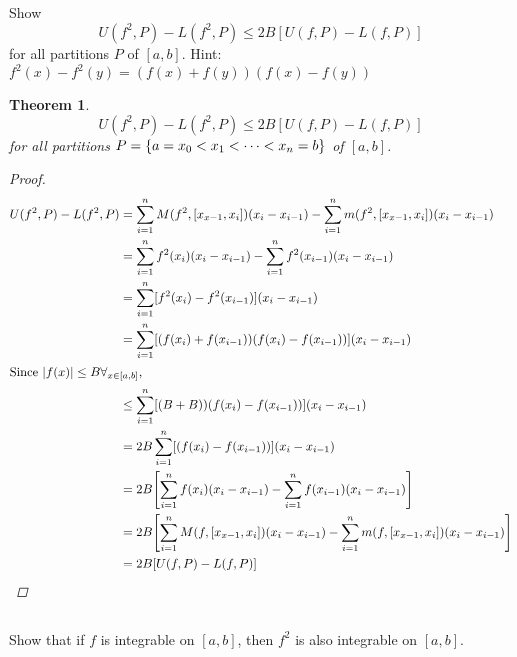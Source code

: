\documentclass[]{article}
\newtheorem{theorem}{Theorem}
\begin{document}
\subsection{}
Show\[
    U(f^2,P) - L(f^2,P) \leq 2 B[U(f,P) - L(f,P)]
\] for all partitions $P$ of $[a,b]$.
Hint: $f^2(x) - f^2(y) = (f(x) + f(y)) (f(x)-f(y))$

\begin{theorem}\label{thm:pblm2a}
    \[
        U(f^2,P) - L(f^2,P) \leq 2 B[U(f,P) - L(f,P)]
    \] for all partitions $P=\qty{a=x_0<x_1<\dots<x_n=b}$ of $[a,b]$.
    \begin{proof}
        \begin{align*}
            U(f^2,P) - L(f^2,P) 
                &= \sum_{i=1}^n M(f^2,[x_{x-1},x_{i}])(x_{i}-x_{i-1}) 
                    - \sum_{i=1}^n m(f^2,[x_{x-1},x_{i}])(x_{i}-x_{i-1})\\
                &= \sum_{i=1}^n f^2(x_i) (x_{i}-x_{i-1}) 
                    - \sum_{i=1}^n f^2(x_{i-1}) (x_{i}-x_{i-1})\\
                &= \sum_{i=1}^n [f^2(x_i) - f^2(x_{i-1})] (x_{i}-x_{i-1})\\
                &= \sum_{i=1}^n [(f(x_i) + f(x_{i-1})) (f(x_{i})-f(x_{i-1}))] (x_{i}-x_{i-1})\\
    \intertext{Since $\abs{f(x)}\leq B \forall_{x\in [a,b]}$,}
                &\leq\sum_{i=1}^n [(B + B)) (f(x_{i})-f(x_{i-1}))] (x_{i}-x_{i-1})\\
                &=2B\sum_{i=1}^n [(f(x_{i})-f(x_{i-1}))] (x_{i}-x_{i-1})\\
                &=2B\qty[
                    \sum_{i=1}^n f(x_i) (x_{i}-x_{i-1}) 
                        - \sum_{i=1}^n f(x_{i-1}) (x_{i}-x_{i-1})
                ]\\
                &= 2B\qty[
                    \sum_{i=1}^n M(f,[x_{x-1},x_{i}])(x_{i}-x_{i-1}) 
                        - \sum_{i=1}^n m(f,[x_{x-1},x_{i}])(x_{i}-x_{i-1})
                ]\\
                &= 2 B[U(f,P) - L(f,P)]
        \end{align*}
    \end{proof}
\end{theorem}

\newpage
\subsection{}
Show that if $f$ is integrable on $[a,b]$, then $f^2$ is also integrable on $[a,b]$.
\end{document}
